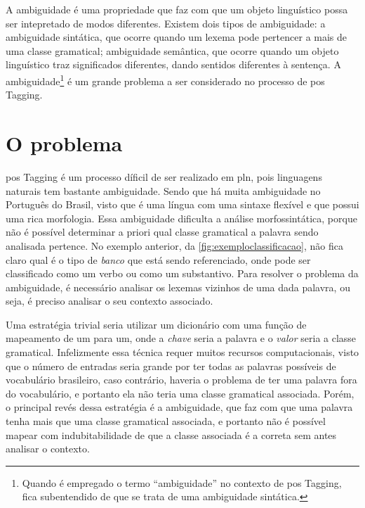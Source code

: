 A ambiguidade é uma propriedade que faz com que um objeto linguístico possa ser intepretado de modos diferentes. Existem dois tipos de ambiguidade: a ambiguidade sintática, que ocorre quando um lexema pode pertencer a mais de uma classe gramatical; ambiguidade semântica, que ocorre quando um objeto linguístico traz significados diferentes, dando sentidos diferentes à sentença. A ambiguidade\footnote{Quando é empregado o termo ``ambiguidade'' no contexto de \ac{pos} Tagging, fica subentendido de que se trata de uma ambiguidade sintática.} é um grande problema a ser considerado no processo de \ac{pos} Tagging. 




\section{O problema}\label{sec:oproblema}

\ac{pos} Tagging é um processo díficil de ser realizado em \ac{pln}, pois linguagens naturais tem bastante ambiguidade. Sendo que há muita ambiguidade no Português do Brasil, visto que é uma língua com uma sintaxe flexível e que possui uma rica morfologia. Essa ambiguidade dificulta a análise morfossintática, porque não é possível determinar a priori qual classe gramatical a palavra sendo analisada pertence. No exemplo anterior, da \autoref{fig:exemploclassificacao}, não fica claro qual é o tipo de \textit{banco} que está sendo referenciado, onde pode ser classificado como um verbo ou como um substantivo. Para resolver o problema da ambiguidade, é necessário analisar os lexemas vizinhos de uma dada palavra, ou seja, é preciso analisar o seu contexto associado.

Uma estratégia trivial seria utilizar um dicionário com uma função de mapeamento de um para um, onde a \textit{chave} seria a palavra e o \textit{valor} seria a classe gramatical. Infelizmente essa técnica requer muitos recursos computacionais, visto que o número de entradas seria grande por ter todas as palavras possíveis de vocabulário brasileiro, caso contrário, haveria o problema de ter uma palavra fora do vocabulário, e portanto ela não teria uma classe gramatical associada. Porém, o principal revés dessa estratégia é a ambiguidade, que faz com que uma palavra tenha mais que uma classe gramatical associada, e portanto não é possível mapear com indubitabilidade de que a classe associada é a correta sem antes analisar o contexto.

